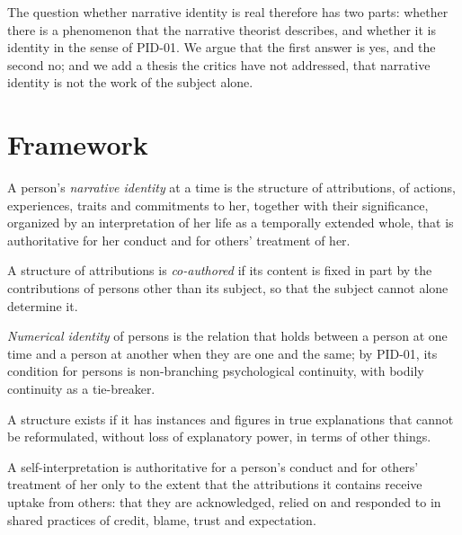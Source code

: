 \documentclass{situationist-preprint}
\begin{document}
The question whether narrative identity is real therefore has two parts: whether there is a phenomenon that the narrative theorist describes, and whether it is identity in the sense of PID-01. We argue that the first answer is yes, and the second no; and we add a thesis the critics have not addressed, that narrative identity is not the work of the subject alone.

\section{Framework}

\begin{definition}\label{d:ni}
A person's \emph{narrative identity} at a time is the structure of attributions, of actions, experiences, traits and commitments to her, together with their significance, organized by an interpretation of her life as a temporally extended whole, that is authoritative for her conduct and for others' treatment of her.
\end{definition}

\begin{definition}[Co-authorship]\label{d:co}
A structure of attributions is \emph{co-authored} if its content is fixed in part by the contributions of persons other than its subject, so that the subject cannot alone determine it.
\end{definition}

\begin{definition}\label{d:num}
\emph{Numerical identity} of persons is the relation that holds between a person at one time and a person at another when they are one and the same; by PID-01, its condition for persons is non-branching psychological continuity, with bodily continuity as a tie-breaker.
\end{definition}

\begin{principle}\label{p:crit}
A structure exists if it has instances and figures in true explanations that cannot be reformulated, without loss of explanatory power, in terms of other things.
\end{principle}

\begin{principle}[Uptake]\label{p:uptake}
A self-interpretation is authoritative for a person's conduct and for others' treatment of her only to the extent that the attributions it contains receive uptake from others: that they are acknowledged, relied on and responded to in shared practices of credit, blame, trust and expectation.
\end{principle}
\end{document}
